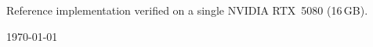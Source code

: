 \begin{titlepage}
\vspace{1.0cm}
{\small\color{gray} Reference implementation verified on a single NVIDIA RTX~5080 (16\,GB).\par}
\vspace{0.4cm}
{\small\today}
\end{titlepage}
